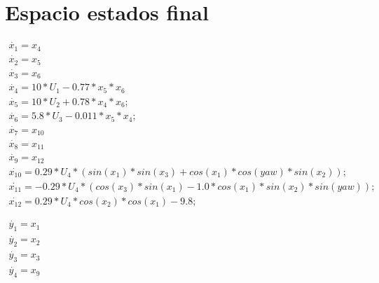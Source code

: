 \documentclass[varwidth,margin=3mm]{standalone}
\begin{document}
\section{Espacio estados final}
\begin{gather*}
	\dot{x_1} = x_4\\
	\dot{x_2} = x_5\\
	\dot{x_3} = x_6\\
	\dot{x_4} = 10*U_1 - 0.77*x_5*x_6\\
	\dot{x_5} = 10*U_2 + 0.78*x_4*x_6;\\
	\dot{x_6} = 5.8*U_3 - 0.011*x_5*x_4;\\
	\dot{x_7} = x_{10}\\
	\dot{x_8} = x_{11}\\
	\dot{x_9} = x_{12}\\
	\dot{x_{10}} = 0.29*U_4*(sin(x_1)*sin(x_3) + cos(x_1)*cos(yaw)*sin(x_2));\\
	\dot{x_{11}}= -0.29*U_4*(cos(x_3)*sin(x_1) - 1.0*cos(x_1)*sin(x_2)*sin(yaw));\\
	\dot{x_{12}} = 0.29*U_4*cos(x_2)*cos(x_1) - 9.8;\\
	\\
	\\
	\dot{y_1} = x_1\\
	\dot{y_2} = x_2\\
	\dot{y_3} = x_3\\
	\dot{y_4} = x_9\\
\end{gather*}
\end{document}
